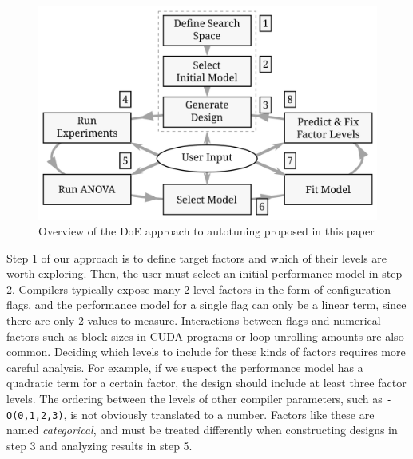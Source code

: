 \documentclass[conference]{IEEEtran}
\begin{document}
\begin{figure}[b]\vspace{-.5cm}
\centering
\includegraphics[width=.95\columnwidth]{./img/doe_anova_strategy.pdf}
\caption{\label{fig:orgb4d0d80}
Overview of the DoE approach to autotuning proposed in this paper}
\end{figure}

Step 1 of our approach is to define target factors and which of their levels are
worth exploring.  Then, the  user must  select an  initial performance  model in
step  2.  Compilers  typically  expose  many 2-level  factors  in  the  form  of
configuration flags, and the  performance model for a single flag  can only be a
linear term,  since there  are only  2 values  to measure.  Interactions between
flags  and numerical  factors  such as  block  sizes in  CUDA  programs or  loop
unrolling amounts  are also common. Deciding  which levels to include  for these
kinds of factors requires more careful  analysis. For example, if we suspect the
performance model has  a quadratic term for a certain  factor, the design should
include at least  three factor levels. The ordering between  the levels of other
compiler parameters,  such as \texttt{-O(0,1,2,3)}, is  not obviously translated
to  a number.  Factors like  these are  named \emph{categorical},  and must  be treated
differently when constructing designs in step 3 and analyzing results in step 5.
\end{document}
